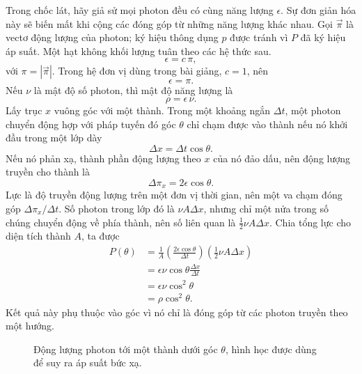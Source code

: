Trong chốc lát, hãy giả sử mọi photon đều có cùng năng lượng \(\epsilon\). Sự đơn giản hóa này sẽ biến mất khi cộng các đóng góp từ những năng lượng khác nhau. Gọi \(\vec{\pi}\) là vectơ động lượng của photon; ký hiệu thông dụng \(p\) được tránh vì \(P\) đã ký hiệu áp suất. Một hạt không khối lượng tuân theo các hệ thức sau.
\begin{equation}
\epsilon=c\,\pi,
\end{equation}
với \(\pi=|\vec{\pi}|\). Trong hệ đơn vị dùng trong bài giảng, \(c=1\), nên
\begin{equation}
\epsilon=\pi.
\end{equation}
Nếu \(\nu\) là mật độ số photon, thì mật độ năng lượng là
\begin{equation}
\rho=\epsilon\,\nu.
\end{equation}
Lấy trục \(x\) vuông góc với một thành. Trong một khoảng ngắn \(\Delta t\), một photon chuyển động hợp với pháp tuyến đó góc \(\theta\) chỉ chạm được vào thành nếu nó khởi đầu trong một lớp dày
\begin{equation}
\Delta x=\Delta t\cos\theta.
\end{equation}
Nếu nó phản xạ, thành phần động lượng theo \(x\) của nó đảo dấu, nên động lượng truyền cho thành là
\begin{equation}
\Delta \pi_x=2\epsilon\cos\theta.
\end{equation}
Lực là độ truyền động lượng trên một đơn vị thời gian, nên một va chạm đóng góp \(\Delta \pi_x/\Delta t\). Số photon trong lớp đó là \(\nu A\Delta x\), nhưng chỉ một nửa trong số chúng chuyển động về phía thành, nên số liên quan là \(\tfrac12 \nu A\Delta x\). Chia tổng lực cho diện tích thành \(A\), ta được
\begin{align}
P(\theta)
&=
\frac{1}{A}
\left(\frac{2\epsilon\cos\theta}{\Delta t}\right)
\left(\frac12 \nu A\Delta x\right) \\
&=
\epsilon\nu\cos\theta\frac{\Delta x}{\Delta t} \\
&=
\epsilon\nu\cos^2\theta \\
&=
\rho\cos^2\theta.
\end{align}
Kết quả này phụ thuộc vào góc vì nó chỉ là đóng góp từ các photon truyền theo một hướng.

\begin{figure}[htbp]
\centering
{}
\caption{Động lượng photon tới một thành dưới góc \(\theta\), hình học được dùng để suy ra áp suất bức xạ.}
\label{fig:c05-photon-pressure}
\end{figure}

